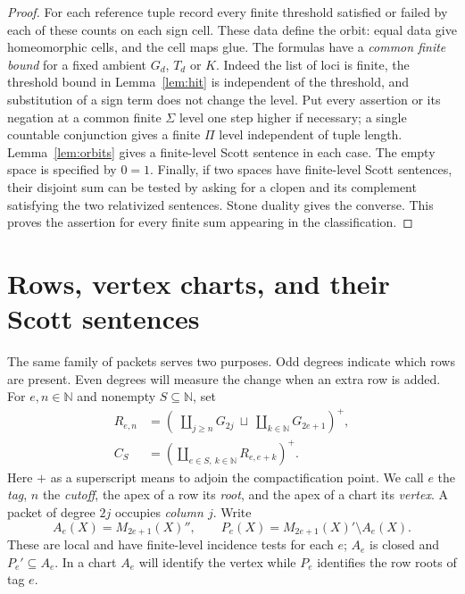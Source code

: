 \documentclass[11pt,letterpaper]{article}
\theoremstyle{definition}\newtheorem{definition}[theorem]{Definition}
\newcommand{\N}{\mathbb N}
\begin{document}
\begin{proof}
For each reference tuple record every finite threshold satisfied or failed
by each of these counts on each sign cell. These data define the orbit:
equal data give homeomorphic cells, and the cell maps glue. The formulas
have a \emph{common finite bound} for a fixed ambient \(G_d\), \(T_d\)
or \(K\). Indeed the list of loci is finite, the threshold bound in
Lemma~\ref{lem:hit} is independent of the threshold, and substitution of
a sign term does not change the level. Put every assertion or its negation
at a common finite \(\Sigma\) level one step higher if necessary; a single
countable conjunction gives a finite \(\Pi\) level independent of tuple
length. Lemma~\ref{lem:orbits} gives a finite-level Scott sentence in
each case. The empty space is specified by \(0=1\). Finally, if two
spaces have finite-level Scott sentences, their disjoint sum can be tested
by asking for a clopen and its complement satisfying the two relativized
sentences. Stone duality gives the converse. This proves the assertion
for every finite sum appearing in the classification.
\end{proof}

\section{Rows, vertex charts, and their Scott sentences}\label{sec:charts}
The same family of packets serves two purposes. Odd degrees indicate
which rows are present. Even degrees will measure the change when an
extra row is added. For \(e,n\in\N\) and nonempty \(S\subseteq\N\), set
\begin{align}
 R_{e,n}
   &=\left(\;\coprod_{j\ge n}G_{2j}\ \sqcup\
                 \coprod_{k\in\N}G_{2e+1}\right)^+ ,\label{eq:row}\\
 C_S&=\left(\coprod_{e\in S,\ k\in\N}R_{e,e+k}\right)^+ .\label{eq:chart}
\end{align}
Here \(+\) as a superscript means to adjoin the compactification point.
We call \(e\) the \emph{tag}, \(n\) the \emph{cutoff}, the apex of a row
its \emph{root}, and the apex of a chart its \emph{vertex}. A packet of
degree \(2j\) occupies \emph{column \(j\)}. Write
\[
    A_e(X)=M_{2e+1}(X)'',\qquad P_e(X)=M_{2e+1}(X)'\setminus A_e(X).
\]
These are local and have finite-level incidence tests for each \(e\);
\(A_e\) is closed and \(P_e'\subseteq A_e\).
In a chart \(A_e\) will identify the vertex while \(P_e\) identifies
the row roots of tag \(e\).
\end{document}
